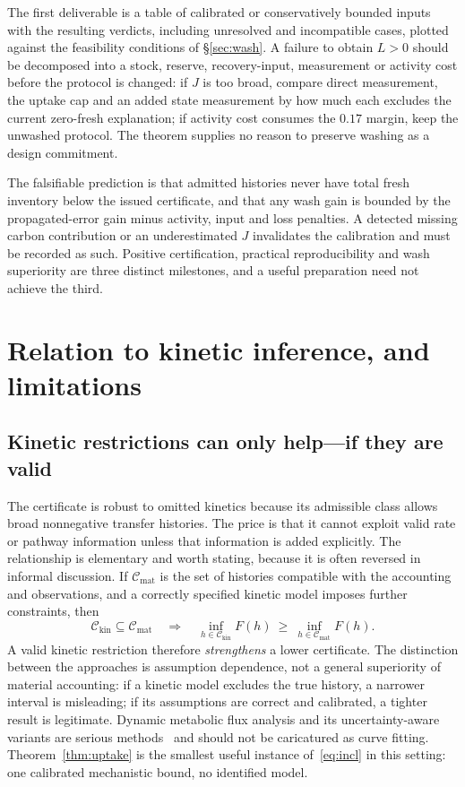 \documentclass[11pt]{article}
\theoremstyle{plain}
\theoremstyle{definition}
\theoremstyle{remark}
\newcommand{\Lc}{L}
\begin{document}
The first deliverable is a table of calibrated or conservatively bounded
inputs with the resulting verdicts, including unresolved and incompatible
cases, plotted against the feasibility conditions of \S\ref{sec:wash}. A
failure to obtain $\Lc>0$ should be decomposed into a stock, reserve,
recovery-input, measurement or activity cost before the protocol is changed:
if $J$ is too broad, compare direct measurement, the uptake cap and an added
state measurement by how much each excludes the current zero-fresh
explanation; if activity cost consumes the $0.17$ margin, keep the unwashed
protocol. The theorem supplies no reason to preserve washing as a design
commitment.

The falsifiable prediction is that admitted histories never have total fresh
inventory below the issued certificate, and that any wash gain is bounded by
the propagated-error gain minus activity, input and loss penalties. A detected
missing carbon contribution or an underestimated $J$ invalidates the
calibration and must be recorded as such. Positive certification, practical
reproducibility and wash superiority are three distinct milestones, and a
useful preparation need not achieve the third.

\section{Relation to kinetic inference, and limitations}\label{sec:disc}

\subsection{Kinetic restrictions can only help---if they are valid}
\label{sec:kinetic}

The certificate is robust to omitted kinetics because its admissible class
allows broad nonnegative transfer histories. The price is that it cannot
exploit valid rate or pathway information unless that information is added
explicitly. The relationship is elementary and worth stating, because it is
often reversed in informal discussion. If $\mathcal C_{\mathrm{mat}}$ is the
set of histories compatible with the accounting and observations, and a
correctly specified kinetic model imposes further constraints, then
\begin{equation}
 \mathcal C_{\mathrm{kin}}\subseteq\mathcal C_{\mathrm{mat}}
 \quad\Longrightarrow\quad
 \inf_{h\in\mathcal C_{\mathrm{kin}}}F(h)
 \ \ge\
 \inf_{h\in\mathcal C_{\mathrm{mat}}}F(h) .
 \label{eq:incl}
\end{equation}
A valid kinetic restriction therefore \emph{strengthens} a lower certificate.
The distinction between the approaches is assumption dependence, not a general
superiority of material accounting: if a kinetic model excludes the true
history, a narrower interval is misleading; if its assumptions are correct and
calibrated, a tighter result is legitimate. Dynamic metabolic flux analysis
and its uncertainty-aware variants are serious
methods~\cite{leighty,pennington} and should not be caricatured as curve
fitting. Theorem~\ref{thm:uptake} is the smallest useful instance
of~\eqref{eq:incl} in this setting: one calibrated mechanistic bound, no
identified model.
\end{document}
